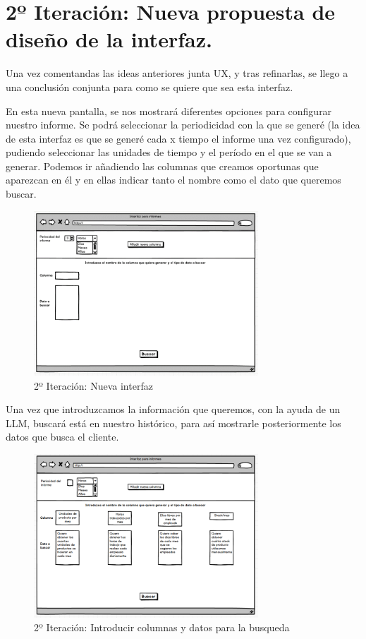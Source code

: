 \section{2º Iteración: Nueva propuesta de diseño de la interfaz.}

Una vez comentandas las ideas anteriores junta UX, y tras refinarlas, se llego a una conclusión conjunta para como se quiere que sea esta interfaz.

En esta nueva pantalla, se nos mostrará diferentes opciones para configurar nuestro informe. Se podrá seleccionar la periodicidad con la que se generé (la idea de esta interfaz es que se generé cada x tiempo el informe una vez configurado), pudiendo seleccionar las unidades de tiempo y el período en el que se van a generar. Podemos ir añadiendo las columnas que creamos oportunas que aparezcan en él y en ellas indicar tanto el nombre como el dato que queremos buscar. 

\begin{figure}[hp!]
    \centering
    \includegraphics[width=0.75\textwidth]{imaxes/iteracion2.1.png}
    \caption{2º Iteración: Nueva interfaz}
    \label{fig:iteracion2.1}
\end{figure}

Una vez que introduzcamos la información que queremos, con la ayuda de un LLM, buscará está en nuestro histórico, para así mostrarle posteriormente los datos que busca el cliente.

\begin{figure}[hp!]
    \centering
    \includegraphics[width=0.75\textwidth]{imaxes/iteracion2.2.png}
    \caption{2º Iteración: Introducir columnas y datos para la busqueda}
    \label{fig:iteracion2.2}
\end{figure}

